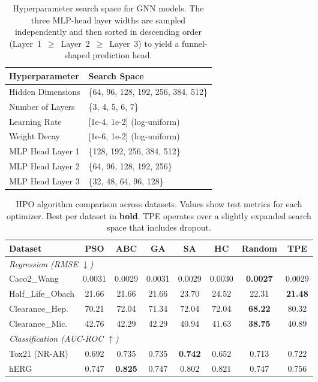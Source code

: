 \documentclass[journal,onecolumn]{IEEEtran}
\begin{document}
\begin{table}[H]
\centering
\caption{Hyperparameter search space for GNN models. The three MLP-head layer widths are sampled independently and then sorted in descending order (Layer~1~$\geq$~Layer~2~$\geq$~Layer~3) to yield a funnel-shaped prediction head.}
\label{tab:search_space}
\small
\begin{tabular}{ll}
\toprule
\textbf{Hyperparameter} & \textbf{Search Space} \\
\midrule
Hidden Dimensions & \{64, 96, 128, 192, 256, 384, 512\} \\
Number of Layers & \{3, 4, 5, 6, 7\} \\
Learning Rate & [1e-4, 1e-2] (log-uniform) \\
Weight Decay & [1e-6, 1e-2] (log-uniform) \\
MLP Head Layer 1 & \{128, 192, 256, 384, 512\} \\
MLP Head Layer 2 & \{64, 96, 128, 192, 256\} \\
MLP Head Layer 3 & \{32, 48, 64, 96, 128\} \\
\bottomrule
\end{tabular}
\end{table}

\begin{table}[!t]
\centering
\caption{HPO algorithm comparison across datasets. Values show test metrics for each optimizer. Best per dataset in \textbf{bold}. TPE operates over a slightly expanded search space that includes dropout.}
\label{tab:hpo_results}
\scriptsize
\begin{tabular}{lccccccc}
\toprule
\textbf{Dataset} & \textbf{PSO} & \textbf{ABC} & \textbf{GA} & \textbf{SA} & \textbf{HC} & \textbf{Random} & \textbf{TPE} \\
\midrule
\multicolumn{8}{l}{\emph{Regression (RMSE $\downarrow$)}} \\
\midrule
Caco2\_Wang & 0.0031 & 0.0029 & 0.0031 & 0.0029 & 0.0030 & \textbf{0.0027} & 0.0029 \\
Half\_Life\_Obach & 21.66 & 21.66 & 21.66 & 23.70 & 24.52 & 22.31 & \textbf{21.48} \\
Clearance\_Hep. & 70.21 & 72.04 & 71.34 & 72.04 & 72.04 & \textbf{68.22} & 80.32 \\
Clearance\_Mic. & 42.76 & 42.29 & 42.29 & 40.94 & 41.63 & \textbf{38.75} & 40.89 \\
\midrule
\multicolumn{8}{l}{\emph{Classification (AUC-ROC $\uparrow$)}} \\
\midrule
Tox21 (NR-AR) & 0.692 & 0.735 & 0.735 & \textbf{0.742} & 0.652 & 0.713 & 0.722 \\
hERG & 0.747 & \textbf{0.825} & 0.747 & 0.802 & 0.821 & 0.747 & 0.756 \\
\bottomrule
\end{tabular}
\end{table}
\end{document}
